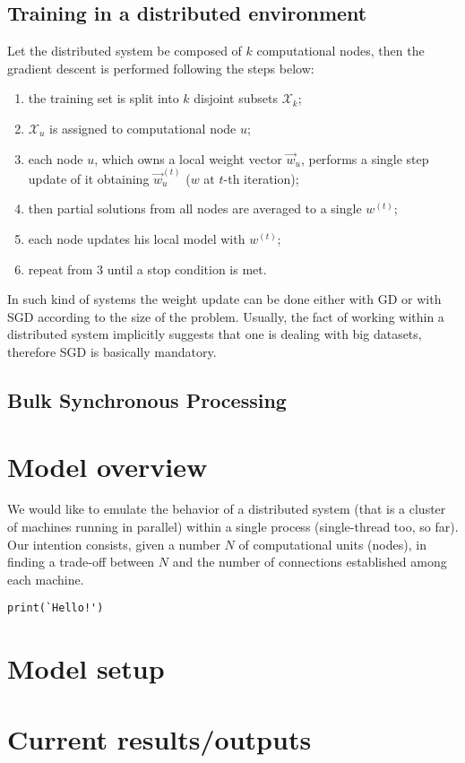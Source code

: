 \documentclass[a4paper,12pt]{article}
\theoremstyle{newplanestyle}
\theoremstyle{newdefinitionstyle}
\theoremstyle{newprovestyle}
\begin{document}
\subsection*{Training in a distributed environment}
Let the distributed system be composed of $k$ computational nodes, then the gradient descent is performed following the steps below:
\begin{enumerate}
\item the training set is split into $k$ disjoint subsets $\mathcal{X}_k$;
\item $\mathcal{X}_u$ is assigned to computational node $u$;
\item each node $u$, which owns a local weight vector $\vec{w}_u$, performs a single step update of it obtaining $\vec{w}^{(t)}_u$ ($w$ at $t$-th iteration);
\item then partial solutions from all nodes are averaged to a single $w^{(t)}$;
\item each node updates his local model with $w^{(t)}$;
\item repeat from 3 until a stop condition is met.
\end{enumerate}
In such kind of systems the weight update can be done either with GD or with SGD according to the size of the problem. Usually, the fact of working within a distributed system implicitly suggests that one is dealing with big datasets, therefore SGD is basically mandatory.


\subsection*{Bulk Synchronous Processing}


\section*{Model overview}
We would like to emulate the behavior of a distributed system (that is a cluster of  machines running in parallel) within a single process (single-thread too, so far). Our intention consists, given a number $N$ of computational units (nodes), in finding a trade-off between $N$ and the number of connections established among each machine.


\begin{lstlisting}
print(`Hello!')
\end{lstlisting}


\section*{Model setup}


\section*{Current results/outputs}




\cleardoublepage

\printbibliography %
\nocite{wiki:gip}
\nocite{wiki:msp}
\end{document}
